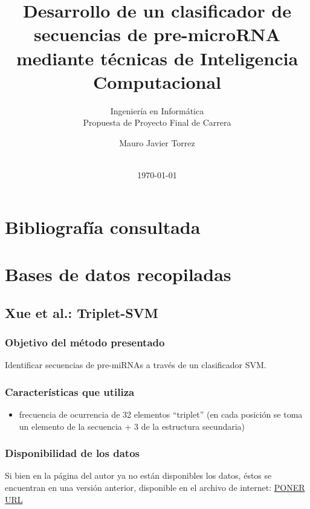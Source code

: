 \documentclass[12pt,bibliography=openstyle,DIV=12,parskip=half-]{scrartcl}
\begin{document}
%
\begin{titlepage}
%
\titlehead{\center Universidad Nacional del Litoral\\
  Facultad de Ingeniería y Ciencias Hídricas}
%
\subtitle{Ingeniería en Informática\\
  Propuesta de Proyecto Final de Carrera}
%
\title{Desarrollo de un clasificador de secuencias de pre-microRNA
  mediante técnicas de Inteligencia Computacional}
\subject{Informe entregable 1}
\author{Mauro Javier Torrez}
%
\publishers{\-\\[4em]{Director\\Dr. Diego H. Milone}\\[2em]
  {Asesora temática\\Dra. Georgina S. Stegmayer}}
%
\date{\-\\[2em]\today}
%
\renewcommand*{\titlepagestyle}{empty}
\maketitle
\end{titlepage}
\setcounter{page}{1}
%
%
%
%
\section{Bibliografía consultada}
\section{Bases de datos recopiladas}
\subsection{Xue et al.: Triplet-SVM}
\subsubsection{Objetivo del método presentado}
Identificar secuencias de pre-miRNAs a través de un clasificador SVM.
\subsubsection{Características que utiliza}
\begin{itemize}
\item frecuencia de ocurrencia de 32 elementos ``triplet''
  (en cada posición se toma un elemento de la secuencia + 3 de la estructura secundaria)
\end{itemize}
\subsubsection{Disponibilidad de los datos}
Si bien en la página del autor ya no están disponibles los datos, éstos se encuentran
en una versión anterior, disponible en el archivo de internet: \url{PONER URL}
\end{document}
